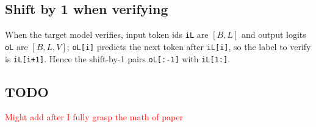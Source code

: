 \documentclass{article}
\begin{document}
\subsection{Shift by 1 when verifying}
When the target model verifies, input token ids \texttt{iL} are $[B,L]$ and output logits \texttt{oL} are $[B,L,V]$; \texttt{oL[i]} predicts the next token after \texttt{iL[i]}, so the label to verify is \texttt{iL[i+1]}. Hence the shift-by-1 pairs \texttt{oL[:-1]} with \texttt{iL[1:]}.

\subsection{TODO}
\textcolor{red}{Might add after I fully grasp the math of paper}
\end{document}
